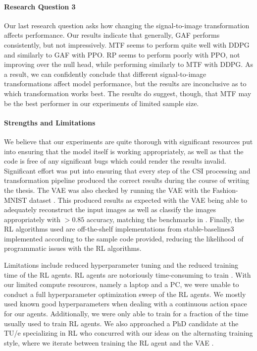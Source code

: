 \paragraph{Research Question 3}
Our last research question asks how changing the signal-to-image transformation affects performance.
Our results indicate that generally, GAF performs consistently, but not impressively.
MTF seems to perform quite well with DDPG and similarly to GAF with PPO.
RP seems to perform poorly with PPO, not improving over the null head, while performing similarly to MTF with DDPG.
As a result, we can confidently conclude that different signal-to-image transformations affect model performance, but the results are inconclusive as to which transformation works best.
The results do suggest, though, that MTF may be the best performer in our experiments of limited sample size.

\paragraph{Strengths and Limitations}
We believe that our experiments are quite thorough with significant resources put into ensuring that the model itself is working appropriately, as well as that the code is free of any significant bugs which could render the results invalid.
Significant effort was put into ensuring that every step of the CSI processing and transformation pipeline produced the correct results during the course of writing the thesis.
The VAE was also checked by running the VAE with the Fashion-MNIST dataset \cite{xiao2017fashion}.
This produced results as expected with the VAE being able to adequately reconstruct the input images as well as classify the images appropriately with $>0.85$ accuracy, matching the benchmarks in \cite{xiao2017fashion}.
Finally, the RL algorithms used are off-the-shelf implementations from stable-baselines3 implemented according to the sample code provided, reducing the likelihood of programmatic issues with the RL algorithms.

Limitations include reduced hyperparameter tuning and the reduced training time of the RL agents.
RL agents are notoriously time-consuming to train \cite{schulman2017proximal,schulman2017trust,lillicrap2015continuous}.
With our limited compute resources, namely a laptop and a PC, we were unable to conduct a full hyperparameter optimization sweep of the RL agents.
We mostly used known good hyperparameters when dealing with a continuous action space for our agents.
Additionally, we were only able to train for a fraction of the time usually used to train RL agents.
We also approached a PhD candidate at the TU/e specializing in RL who concurred with our ideas on the alternating training style, where we iterate between training the RL agent and the VAE \cite{grooten2023interview}.

